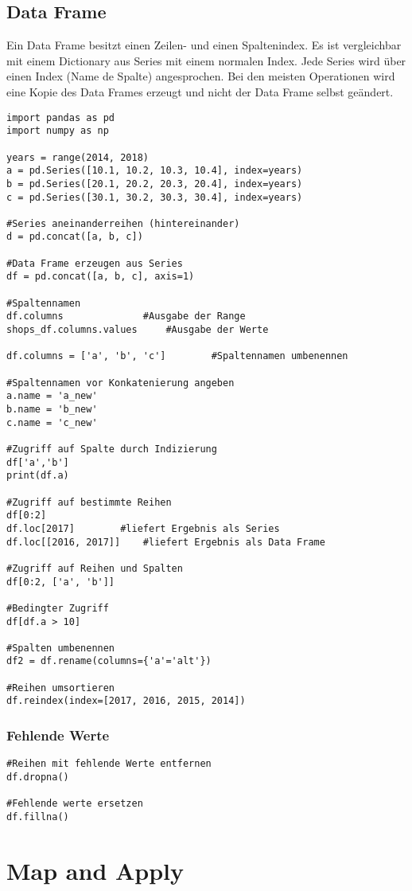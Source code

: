 \subsection{Data Frame}
Ein Data Frame besitzt einen Zeilen- und einen Spaltenindex. Es ist vergleichbar mit einem Dictionary aus Series mit einem normalen Index. Jede Series wird über einen Index (Name de Spalte) angesprochen. Bei den meisten Operationen wird eine Kopie des Data Frames erzeugt und nicht der Data Frame selbst geändert.
\begin{lstlisting}
import pandas as pd
import numpy as np

years = range(2014, 2018)
a = pd.Series([10.1, 10.2, 10.3, 10.4], index=years)
b = pd.Series([20.1, 20.2, 20.3, 20.4], index=years)
c = pd.Series([30.1, 30.2, 30.3, 30.4], index=years)

#Series aneinanderreihen (hintereinander)
d = pd.concat([a, b, c])

#Data Frame erzeugen aus Series
df = pd.concat([a, b, c], axis=1)

#Spaltennamen
df.columns				#Ausgabe der Range
shops_df.columns.values		#Ausgabe der Werte

df.columns = ['a', 'b', 'c']		#Spaltennamen umbenennen

#Spaltennamen vor Konkatenierung angeben
a.name = 'a_new'
b.name = 'b_new'
c.name = 'c_new'

#Zugriff auf Spalte durch Indizierung
df['a','b']
print(df.a)

#Zugriff auf bestimmte Reihen
df[0:2]
df.loc[2017]		#liefert Ergebnis als Series
df.loc[[2016, 2017]]	#liefert Ergebnis als Data Frame

#Zugriff auf Reihen und Spalten
df[0:2, ['a', 'b']]

#Bedingter Zugriff
df[df.a > 10]

#Spalten umbenennen
df2 = df.rename(columns={'a'='alt'})

#Reihen umsortieren
df.reindex(index=[2017, 2016, 2015, 2014])
\end{lstlisting}
\subsubsection{Fehlende Werte}
\begin{lstlisting}
#Reihen mit fehlende Werte entfernen
df.dropna()

#Fehlende werte ersetzen
df.fillna()
\end{lstlisting}
\section{Map and Apply}
